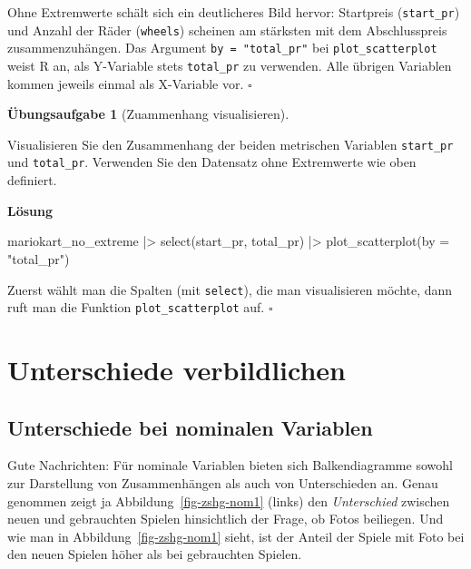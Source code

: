 \documentclass[
  letterpaper,
  twoside,
  open=any]{scrbook}
\newenvironment{Shaded}{\begin{snugshade}}{\end{snugshade}}
\newcommand{\AttributeTok}[1]{\textcolor[rgb]{0.40,0.45,0.13}{#1}}
\newcommand{\FunctionTok}[1]{\textcolor[rgb]{0.28,0.35,0.67}{#1}}
\newcommand{\NormalTok}[1]{\textcolor[rgb]{0.00,0.23,0.31}{#1}}
\newcommand{\SpecialCharTok}[1]{\textcolor[rgb]{0.37,0.37,0.37}{#1}}
\newcommand{\StringTok}[1]{\textcolor[rgb]{0.13,0.47,0.30}{#1}}
\theoremstyle{definition}
\theoremstyle{definition}
\newtheorem{exercise}{Übungsaufgabe}[chapter]
\theoremstyle{definition}
\theoremstyle{remark}
\begin{document}
Ohne Extremwerte schält sich ein deutlicheres Bild hervor: Startpreis
(\texttt{start\_pr}) und Anzahl der Räder (\texttt{wheels}) scheinen am
stärksten mit dem Abschlusspreis zusammenzuhängen. Das Argument
\texttt{by\ =\ "total\_pr"} bei \texttt{plot\_scatterplot} weist R an,
als Y-Variable stets \texttt{total\_pr} zu verwenden. Alle übrigen
Variablen kommen jeweils einmal als X-Variable vor. \(\square\)

\begin{exercise}[Zuammenhang
visualisieren]\protect\hypertarget{exr-zsmnhang-metrisch}{}\label{exr-zsmnhang-metrisch}

Visualisieren Sie den Zusammenhang der beiden metrischen Variablen
\texttt{start\_pr} und \texttt{total\_pr}. Verwenden Sie den Datensatz
ohne Extremwerte wie oben definiert.

\textbf{Lösung}

\begin{Shaded}
\begin{Highlighting}[]
\NormalTok{mariokart\_no\_extreme }\SpecialCharTok{|\textgreater{}} 
  \FunctionTok{select}\NormalTok{(start\_pr, total\_pr) }\SpecialCharTok{|\textgreater{}} 
  \FunctionTok{plot\_scatterplot}\NormalTok{(}\AttributeTok{by =} \StringTok{"total\_pr"}\NormalTok{)}
\end{Highlighting}
\end{Shaded}

Zuerst wählt man die Spalten (mit \texttt{select}), die man
visualisieren möchte, dann ruft man die Funktion
\texttt{plot\_scatterplot} auf. \(\square\)

\end{exercise}

\section{Unterschiede verbildlichen}\label{unterschiede-verbildlichen}

\subsection{Unterschiede bei nominalen
Variablen}\label{unterschiede-bei-nominalen-variablen}

Gute Nachrichten: Für nominale Variablen bieten sich Balkendiagramme
sowohl zur Darstellung von Zusammenhängen als auch von Unterschieden an.
Genau genommen zeigt ja Abbildung~\ref{fig-zshg-nom1} (links) den
\emph{Unterschied} zwischen neuen und gebrauchten Spielen hinsichtlich
der Frage, ob Fotos beiliegen. Und wie man in
Abbildung~\ref{fig-zshg-nom1} sieht, ist der Anteil der Spiele mit Foto
bei den neuen Spielen höher als bei gebrauchten Spielen.
\end{document}
